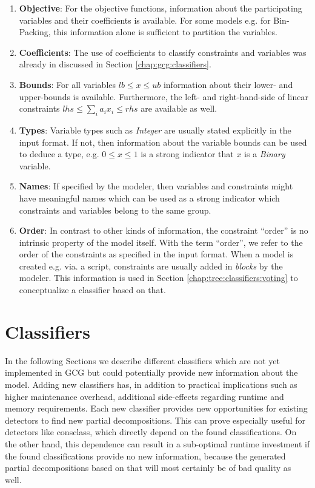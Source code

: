 		\begin{enumerate}
			\item \textbf{Objective}: For the objective functions, information about the participating variables and their coefficients is available. For some models e.g. for Bin-Packing, this information alone is sufficient to partition the variables.
			\item \textbf{Coefficients}:
			The use of coefficients to classify constraints and variables was already in discussed in Section \ref{chap:gcg:classifiers}.
			\item \textbf{Bounds}: For all variables $lb \leq x \leq ub$ information about their lower- and upper-bounds is available.
			Furthermore, the left- and right-hand-side of linear constraints $lhs \leq \sum_i a_i x_i \leq rhs$ are available as well.
			\item \textbf{Types}: Variable types such as \textit{Integer} are usually stated explicitly in the input format. If not, then information about the variable bounds can be used to deduce a type, e.g. $0 \leq x \leq 1$ is a strong indicator that $x$ is a \textit{Binary} variable.
			\item \textbf{Names}: If specified by the modeler, then variables and constraints might have meaningful names which can be used as a strong indicator which constraints and variables belong to the same group.
			\item \textbf{Order}: In contrast to other kinds of information, the constraint \enquote{order} is no intrinsic property of the model itself. With the term \enquote{order}, we refer to the order of the constraints as specified in the input format. When a model is created e.g. via. a script, constraints are usually added in \textit{blocks} by the modeler. This information is used in Section \ref{chap:tree:classifiers:voting} to conceptualize a classifier based on that.
		\end{enumerate}
	
	\section{Classifiers}
	
		In the following Sections we describe different classifiers which are not yet implemented in \ac{GCG} but could potentially provide new information about the model.
		Adding new classifiers has, in addition to practical implications such as higher maintenance overhead, additional side-effects regarding runtime and memory requirements.
		Each new classifier provides new opportunities for existing detectors to find new partial decompositions.
		This can prove especially useful for detectors like consclass, which directly depend on the found classifications.
		On the other hand, this dependence can result in a sub-optimal runtime investment if the found classifications provide no new information, because the generated partial decompositions based on that will most certainly be of bad quality as well. 
		
